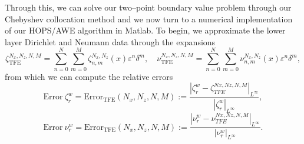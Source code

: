 Through this, we can solve our two--point boundary value problem through our Chebyshev collocation method and we now turn to a  numerical implementation of our HOPS/AWE algorithm in Matlab. To begin, we approximate the lower layer Dirichlet and Neumann data through the expansions
$$\zeta_{\text{TFE}}^{N_x,N_z,N,M}=\sum_{n=0}^N\sum_{m=0}^M \zeta_{n,m}^{N_x,N_z}(x)\varepsilon^n\delta^m, \quad
\nu_{\text{TFE}}^{N_x,N_z,N,M}=\sum_{n=0}^N\sum_{m=0}^M \nu_{n,m}^{N_x,N_z}(x)\varepsilon^n\delta^m,$$
from which we can compute the relative errors
$$\text{Error} ~{\zeta^w_r}=\text{Error}_{\text{TFE}}(N_x,N_z,N,M):=\frac{\left|\zeta^w_r-\zeta_{TFE}^{Nx,Nz,N,M}\right|_{L^{\infty}}}{|\zeta^w_r|_{L^{\infty}}},$$
$$\text{Error}~{\nu^w_r}=\text{Error}_{\text{TFE}}(N_x,N_z,N,M):=\frac{\left|\nu^w_r-\nu_{TFE}^{Nx,Nz,N,M}\right|_{L^{\infty}}}{|\nu^w_r|_{L^{\infty}}}.$$

